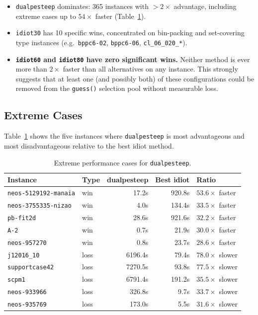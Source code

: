 \documentclass[11pt,a4paper]{article}
\begin{document}
\begin{itemize}
  \item \texttt{dualpesteep} dominates: 365 instances with $>2\times$ advantage,
        including extreme cases up to $54\times$ faster (Table~\ref{tab:extreme}).
  \item \texttt{idiot30} has 10 specific wins, concentrated on bin-packing and
        set-covering type instances (e.g.\ \texttt{bppc6-02}, \texttt{bppc6-06},
        \texttt{cl\_06\_020\_*}).
  \item \textbf{\texttt{idiot60} and \texttt{idiot80} have zero significant wins.}
        Neither method is ever more than $2\times$ faster than all alternatives on
        any instance. This strongly suggests that at least one (and possibly both)
        of these configurations could be removed from the \texttt{guess()} selection
        pool without measurable loss.
\end{itemize}

\subsection{Extreme Cases}
\label{sec:extreme}

Table~\ref{tab:extreme} shows the five instances where \texttt{dualpesteep} is
most advantageous and most disadvantageous relative to the best idiot method.

\begin{table}[h]
\centering
\caption{Extreme performance cases for \texttt{dualpesteep}.}
\label{tab:extreme}
\begin{tabular}{llrrl}
\toprule
\textbf{Instance} & \textbf{Type} & \textbf{dualpesteep} & \textbf{Best idiot} & \textbf{Ratio} \\
\midrule
\texttt{neos-5129192-manaia} & win & 17.2s & 920.8s & $53.6\times$ faster \\
\texttt{neos-3755335-nizao}  & win &  4.0s & 134.4s & $33.5\times$ faster \\
\texttt{pb-fit2d}            & win & 28.6s & 921.6s & $32.2\times$ faster \\
\texttt{A-2}                 & win &  0.7s &  21.9s & $30.0\times$ faster \\
\texttt{neos-957270}         & win &  0.8s &  23.7s & $28.6\times$ faster \\
\midrule
\texttt{j12016\_10}          & loss & 6196.4s &  79.4s & $78.0\times$ slower \\
\texttt{supportcase42}       & loss & 7270.5s &  93.8s & $77.5\times$ slower \\
\texttt{scpm1}               & loss & 6791.4s & 191.2s & $35.5\times$ slower \\
\texttt{neos-933966}         & loss &  326.8s &   9.7s & $33.7\times$ slower \\
\texttt{neos-935769}         & loss &  173.0s &   5.5s & $31.6\times$ slower \\
\bottomrule
\end{tabular}
\end{table}
\end{document}
